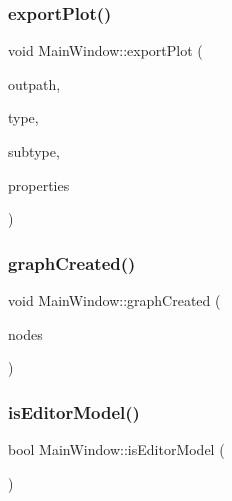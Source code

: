 \mbox{\label{class_main_window_ad5ae71203bc0a312c21fefc54cc58ec3}} 
\subsubsection{\texorpdfstring{exportPlot()}{exportPlot()}}
{\footnotesize\ttfamily void Main\+Window\+::export\+Plot (\begin{DoxyParamCaption}\item[{Q\+String}]{outpath,  }\item[{\mbox{\hyperlink{class_stats_controller_a57467d760850639d3b0c55277b7e7ee9}{Stats\+Controller\+::\+Stat\+Type}}}]{type,  }\item[{int}]{subtype,  }\item[{const \mbox{\hyperlink{struct_graph_properties}{Graph\+Properties}} \&}]{properties }\end{DoxyParamCaption})\hspace{0.3cm}{\ttfamily [protected]}}

\mbox{\label{class_main_window_a3f07463bdfda34bc0f3bc566759e1823}} 
\subsubsection{\texorpdfstring{graphCreated()}{graphCreated()}}
{\footnotesize\ttfamily void Main\+Window\+::graph\+Created (\begin{DoxyParamCaption}\item[{const Q\+List$<$ \mbox{\hyperlink{class_graph_builder_1_1_node}{Graph\+Builder\+::\+Node}} $>$ \&}]{nodes }\end{DoxyParamCaption})}

\mbox{\label{class_main_window_a6c6556ce554be01fc13f9c3a790a5409}} 
\subsubsection{\texorpdfstring{isEditorModel()}{isEditorModel()}}
{\footnotesize\ttfamily bool Main\+Window\+::is\+Editor\+Model (\begin{DoxyParamCaption}{ }\end{DoxyParamCaption})\hspace{0.3cm}{\ttfamily [protected]}}

